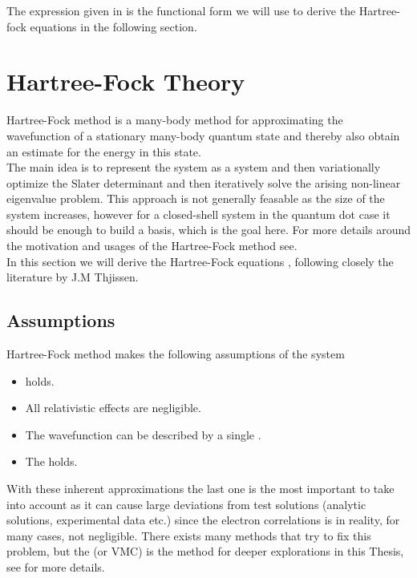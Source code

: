    The expression given in  is the functional form we will
    use to derive the Hartree-fock equations in the following section.

\section{Hartree-Fock Theory\label{sec:HFtheory}}
    Hartree-Fock method is a many-body method for approximating the
    wavefunction of a stationary many-body quantum state and thereby also
    obtain an estimate for the energy in this state. \\
    The main idea is to represent the system as a  system
    and then variationally optimize the Slater determinant
    \cite{HelgakerMolElcTheory} and then iteratively solve the arising
    non-linear eigenvalue problem. This approach is not generally feasable as
    the size of the system increases, however for a closed-shell system in the
    quantum dot case it should be enough to build a basis, which is the goal
    here.
    For more details around the motivation and usages of the Hartree-Fock
    method see\cite{HelgakerMolElcTheory}. \\
    
    In this section we will derive the Hartree-Fock equations , following
    closely the literature by J.M Thjissen\cite{compphysThijssen}. 

    \subsection{Assumptions}
        Hartree-Fock method makes the following assumptions of the system
            \begin{itemize}
                \item {} holds. 
                \item All relativistic effects are negligible.
                \item The wavefunction can be described by a single
                    .
                \item The  holds.
            \end{itemize}
        With these inherent approximations the last one is the most important
        to take into account as it can cause large deviations from test
        solutions (analytic solutions, experimental data etc.) since the
        electron correlations is in reality, for many cases, not negligible.
        There exists many methods that try to fix this problem, but the
         (or VMC) is the method for deeper
        explorations in this Thesis, see  for more details.
    
